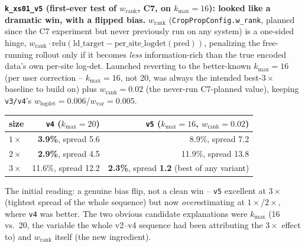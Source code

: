 \documentclass[11pt]{article}
\begin{document}
\textbf{\texttt{k\_xs01\_v5} (first-ever test of $w_{\mathrm{rank}}$,
C7, on $k_{\max}{=}16$): looked like a dramatic win, with a flipped
bias.} $w_{\mathrm{rank}}$ (\texttt{CropPropConfig.w\_rank}, planned
since the C7 experiment but never previously run on any system) is a
one-sided hinge, $w_{\mathrm{rank}}\cdot\mathrm{relu}(\mathrm{ld\_target} -
\mathrm{per\_site\_logdet}(\mathrm{pred}))$, penalizing the free-running
rollout only if it becomes \emph{less} information-rich than the true
encoded data's own per-site log-det. Launched reverting to the
better-known $k_{\max}{=}16$ (per user correction -- $k_{\max}{=}16$, not
20, was always the intended best-$3\times$ baseline to build on) plus
$w_{\mathrm{rank}}{=}0.02$ (the never-run C7-planned value), keeping
\texttt{v3/v4}'s $w_{\mathrm{logdet}}{=}0.006$/$w_{\mathrm{var}}{=}0.005$.

\begin{center}
\begin{tabular}{lrr}
\toprule
size & \texttt{v4} ($k_{\max}{=}20$) & \texttt{v5} ($k_{\max}{=}16$, $w_{\mathrm{rank}}{=}0.02$) \\
\midrule
$1\times$ & \textbf{3.9\%}, spread 5.6  & 8.9\%, spread 7.2 \\
$2\times$ & \textbf{2.9\%}, spread 4.5  & 11.9\%, spread 13.8 \\
$3\times$ & 11.6\%, spread 12.2 & \textbf{2.3\%}, spread \textbf{1.2} (best of any variant) \\
\bottomrule
\end{tabular}
\end{center}

The initial reading: a genuine bias flip, not a clean win -- \texttt{v5}
excellent at $3\times$ (tightest spread of the whole sequence) but now
\emph{over}estimating at $1\times$/$2\times$, where \texttt{v4} was
better. The two obvious candidate explanations were $k_{\max}$ (16 vs.\
20, the variable the whole v2--v4 sequence had been attributing the
$3\times$ effect to) and $w_{\mathrm{rank}}$ itself (the new ingredient).
\end{document}
